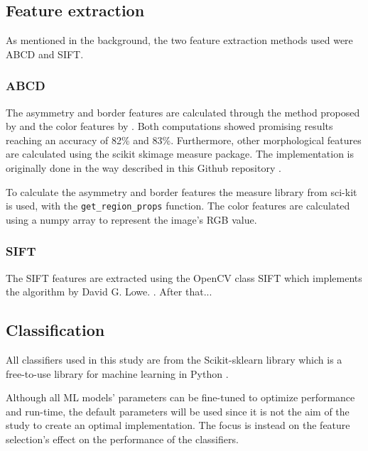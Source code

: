 \documentclass{kththesis}
\begin{document}
\subsection{Feature extraction}

As mentioned in the background, the two feature extraction methods used were ABCD and SIFT.

\subsubsection{ABCD} %

The asymmetry and border features are calculated through the method proposed by \parencite{inproceedings} and the color features by \parencite{celebi2008automatic}. Both computations showed promising results reaching an accuracy of 82\% and 83\%. Furthermore, other morphological features are calculated using the scikit skimage measure package. The implementation is originally done in the way described in this Github repository \parencite{melanoma-classifier}.

To calculate the asymmetry and border features the measure library from sci-kit is used, with the \verb|get_region_props| function.
The color features are calculated using a numpy array to represent the image's RGB value.



\subsubsection{SIFT}

The SIFT features are extracted using the OpenCV class SIFT which implements the algorithm by David G. Lowe. \parencite{sift-opencv} \parencite{lowe2004distinctive}.
After that...


\subsection{Classification}

All classifiers used in this study are from the Scikit-sklearn library which is a free-to-use library for machine learning in Python \parencite{scikit-learn-doc}.

Although all ML models’ parameters can be fine-tuned to optimize performance and run-time, the default parameters will be used since it is not the aim of the study to create an optimal implementation. The focus is instead on the feature selection’s effect on the performance of the classifiers.
\end{document}
